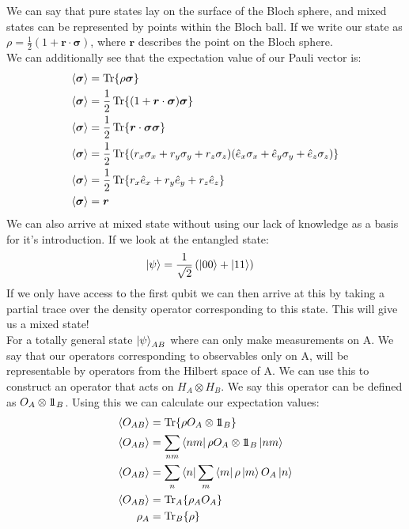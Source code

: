 We can say that pure states lay on the surface of the Bloch sphere, and mixed states can be represented by points within the Bloch ball. If we write our state as $\rho = \frac{1}{2}(1 + \bm{r}\cdot\bm{\sigma})$, where $\bm{r}$ describes the point on the Bloch sphere.\\
We can additionally see that the expectation value of our Pauli vector is:
\begin{align*}
	\expval{\bm{\sigma}} &= \Tr{\rho\bm{\sigma}} \\
	\expval{\bm{\sigma}} &= \frac{1}{2}\Tr{(1+ \bm{r}\cdot\bm{\sigma})\bm{\sigma}} \\
	\expval{\bm{\sigma}} &= \frac{1}{2}\Tr{\bm{r}\cdot\bm{\sigma}\bm{\sigma}} \\
	\expval{\bm{\sigma}} &= \frac{1}{2}\Tr{(r_x\sigma_x + r_y\sigma_y + r_z\sigma_z)(\hat{e}_x\sigma_x + \hat{e}_y\sigma_y + \hat{e}_z\sigma_z)} \\
	\expval{\bm{\sigma}} &= \frac{1}{2}\Tr{r_x\hat{e}_x + r_y\hat{e}_y + r_z\hat{e}_z} \\
	\expval{\bm{\sigma}} &= \bm{r}
\end{align*}
We can also arrive at mixed state without using our lack of knowledge as a basis for it's introduction. If we look at the entangled state:
\begin{align*}
	\ket{\psi} &= \frac{1}{\sqrt{2}} \left(\ket{00} + \ket{11}\right)
\end{align*}
If we only have access to the first qubit we can then arrive at this by taking a partial trace over the density operator corresponding to this state. This will give us a mixed state!\\
For a totally general state $\ket{\psi}_{AB}$ where can only make measurements on A. We say that our operators corresponding to observables only on A, will be representable by operators from the Hilbert space of A.
We can use this to construct an operator that acts on $H_A\otimes H_B$. We say this operator can be defined as $O_A\otimes 1\!\!1_B$. Using this we can calculate our expectation values:
\begin{align*}
	\expval{O_{AB}} &= \Tr{\rho O_A\otimes1\!\!1_B} \\
	\expval{O_{AB}} &= \sum_{nm}\bra{nm}\rho O_A\otimes1\!\!1_B \ket{nm} \\
	\expval{O_{AB}} &= \sum_{n}\bra{n}\sum_m\bra{m}\rho\ket{m} O_A \ket{n} \\
	\expval{O_{AB}} &= \Tr_A\{\rho_AO_A\} \\
	\rho_A &= \Tr_B\{\rho\}
\end{align*}
